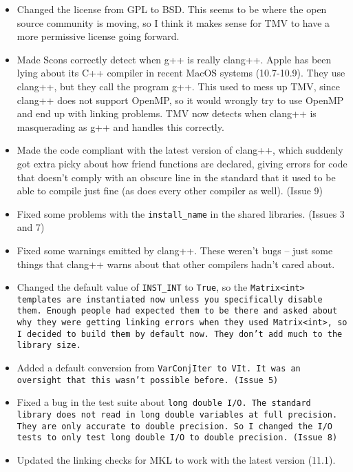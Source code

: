 \begin{itemize}

\item Changed the license from GPL to BSD.  This seems to be where the open 
source community is moving, so I think it makes sense for TMV to have a 
more permissive license going forward.

\item
Made Scons correctly detect when g++ is really clang++.  Apple has been lying about
its C++ compiler in recent MacOS systems (10.7-10.9).  They use clang++,
but they call the program g++.  This used to mess up TMV, since clang++ 
does not support OpenMP, so it would wrongly try to use OpenMP and end up 
with linking problems.  TMV now detects when clang++ is masquerading as
g++ and handles this correctly.

\item
Made the code compliant with the latest version of clang++, which suddenly
got extra picky about how friend functions are declared, giving errors
for code that doesn't comply with an obscure line in the standard that 
it used to be able to compile just fine (as does every other compiler as
well).  (Issue 9)

\item
Fixed some problems with the \texttt{install\_name} in the shared libraries.  
(Issues 3 and 7)

\item
Fixed some warnings emitted by clang++.  These weren't bugs -- just some
things that clang++ warns about that other compilers hadn't cared about.

\item
Changed the default value of \texttt{INST\_INT} to \texttt{True}, so the \tt{Matrix<int>}
templates are instantiated now unless you specifically disable them.  Enough people
had expected them to be there and asked about why they were getting 
linking errors when they used \tt{Matrix<int>}, so I decided to build them
by default now.  They don't add much to the library size.

\item
Added a default conversion from \tt{VarConjIter} to \tt{VIt}.  It was an oversight
that this wasn't possible before.  (Issue 5)

\item 
Fixed a bug in the test suite about \tt{long double} I/O.  The standard library does
not read in \tt{long double} variables at full precision.  They are only accurate to
double precision.  So I changed the I/O tests to only test \tt{long double} I/O
to double precision.  (Issue 8)

\item
Updated the linking checks for MKL to work with the latest version (11.1).

\end{itemize}

